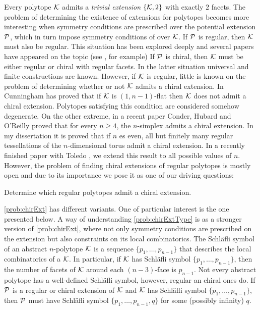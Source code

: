 \documentclass[a4paper,12pt,english]{article}
\begin{document}
Every polytope $\mathcal{K}$ admits a \emph{trivial extension} $\left\{ \mathcal{K}, 2 \right\} $ with exactly $2$ facets.
The problem of determining the existence of extensions for polytopes becomes more interesting when symmetry conditions are prescribed over the potential extension $\mathcal{P}$, which in turn impose symmetry conditions of over $\mathcal{K}$.
If $\mathcal{P}$ is regular, then $\mathcal{K}$ must also be regular.
This situation has been explored deeply and several papers have appeared on the topic 
(see \cite{Pellicer2010_ExtensionsDuallyBipartite,Pellicer2009_ExtensionsRegularPolytopes,Schulte1985_ExtensionsRegularComplexes,Schulte1983_ArrangingRegularIncidence,Schulte1990_ClassAbstractPolytopes, Danzer1984_RegularIncidenceComplexes}, for example)
If $\mathcal{P}$ is chiral, then $\mathcal{K}$ must be either regular or chiral with regular facets.
In the latter situation universal \cite{SchulWeiss1995_FreeExtensionsChiral} and finite \cite{CunniPelli2014_ChiralExtensionsChiral,Montero2021_SchlaefliSymbolChiral} constructions are known. However, if $\mathcal{K}$ is regular, little is known on the problem of determining whether or not $\mathcal{K}$ admits a chiral extension.
In \cite{Cunningham2017_NonFlatRegular} Cunningham has proved that if $\mathcal{K}$ is $(1,n-1)$-flat then $\mathcal{K}$ does not admit a chiral extension.
Polytopes satisfying this condition are considered somehow degenerate.
On the other extreme, in a recent paper \cite{CondHubORe2024_ConstructionChiralPolytopes} Conder, Hubard and O'Reilly proved that for every $n \geq 4$, the $n$-simplex admits a chiral extension.
In my dissertation \cite{Montero2019_ChiralExtensionsToroids_PhDThesis} it is proved that if $n$ es even, all but finitely many regular tessellations of the $n$-dimensional torus admit a chiral extension.
In a recently finished paper with Toledo \cite{MonteToled_ChiralExtensionsRegular_preprint}, we extend this result to all possible values of $n$.
However, the problem of finding chiral extensions of regular polytopes is mostly open and due to its importance we pose it as one of our driving questions: 

\begin{problem}\label{prob:chirExt}
 Determine which regular polytopes admit a chiral extension.
\end{problem}


\cref{prob:chirExt} has different variants. One of particular interest is the one presented below. A way of understanding \cref{prob:chirExtType} is as a stronger version of  \cref{prob:chirExt}, where not only symmetry conditions are prescribed on the extension but also constraints on its local combinatorics. 
The Schläfli symbol of an abstract $n$-polytope $\mathcal{K}$ is a sequence $\{p_{1}, \dots, p_{n-1}\}$ that describes the local combinatorics of a $\mathcal{K}$. 
In particular, if $\mathcal{K}$ has Schläfli symbol $\{p_{1}, \dots, p_{n-1}\}$, then the number of facets of $\mathcal{K}$ around each $(n-3)$-face is $p_{n-1}$.
Not every abstract polytope has a well-defined Schläfli symbol, however, regular an chiral ones do. 
If $\mathcal{P}$ is a regular or chiral extension of $\mathcal{K}$ and $\mathcal{K}$ has Schläfli symbol $\{p_{1}, \dots, p_{n-1}\}$, then $\mathcal{P}$ must have Schläfli symbol $\{p_{1}, \dots, p_{n-1}, q\}$ for some (possibly infinity) $q$.
\end{document}
